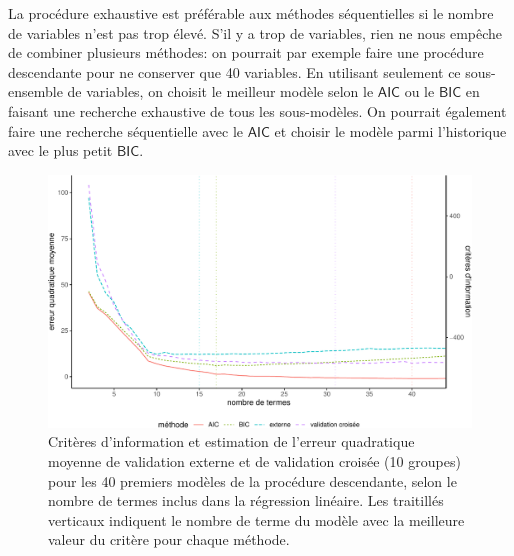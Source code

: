 \documentclass[
  11pt,
  letterpaper,
]{book}
\theoremstyle{definition}
\theoremstyle{remark}
\begin{document}
La procédure exhaustive est préférable aux méthodes séquentielles si le
nombre de variables n'est pas trop élevé. S'il y a trop de variables,
rien ne nous empêche de combiner plusieurs méthodes: on pourrait par
exemple faire une procédure descendante pour ne conserver que 40
variables. En utilisant seulement ce sous-ensemble de variables, on
choisit le meilleur modèle selon le \(\mathsf{AIC}\) ou le
\(\mathsf{BIC}\) en faisant une recherche exhaustive de tous les
sous-modèles. On pourrait également faire une recherche séquentielle
avec le \(\mathsf{AIC}\) et choisir le modèle parmi l'historique avec le
plus petit \(\mathsf{BIC}\).

\begin{figure}[ht!]

{\centering \includegraphics[width=1\textwidth,height=\textheight]{./04-selectionmodeles_files/figure-pdf/fig-perfo-sequentiel-1.pdf}

}

\caption{\label{fig-perfo-sequentiel}Critères d'information et
estimation de l'erreur quadratique moyenne de validation externe et de
validation croisée (10 groupes) pour les 40 premiers modèles de la
procédure descendante, selon le nombre de termes inclus dans la
régression linéaire. Les traitillés verticaux indiquent le nombre de
terme du modèle avec la meilleure valeur du critère pour chaque
méthode.}

\end{figure}
\end{document}
